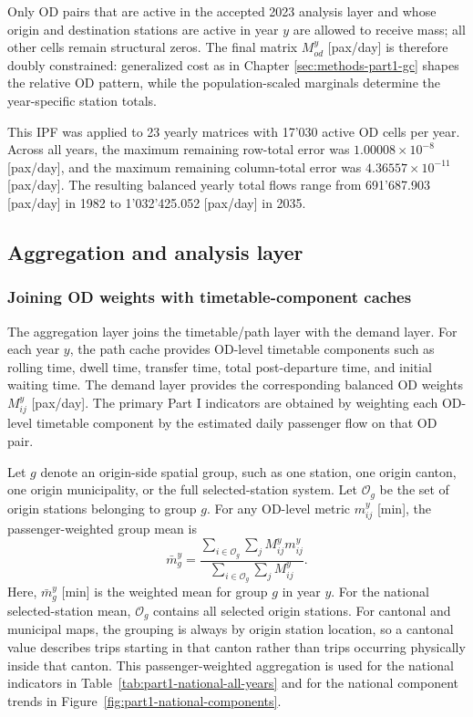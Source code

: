 \documentclass[preprint,12pt]{elsarticle}
\begin{document}
Only OD pairs that are active in the accepted 2023 analysis layer and whose origin and destination stations are active in year $y$ are allowed to receive mass; all other cells remain structural zeros. The final matrix $M^y_{od}$ [pax/day] is therefore doubly constrained: generalized cost as in Chapter \ref{sec:methods-part1-gc} shapes the relative OD pattern, while the population-scaled marginals determine the year-specific station totals.

This IPF was applied to 23 yearly matrices with 17'030 active OD cells per year. Across all years, the maximum remaining row-total error was $1.00008\times10^{-8}$ [pax/day], and the maximum remaining column-total error was $4.36557\times10^{-11}$ [pax/day]. The resulting balanced yearly total flows range from 691'687.903 [pax/day] in 1982 to 1'032'425.052 [pax/day] in 2035.

\subsection{Aggregation and analysis layer}

\subsubsection{Joining OD weights with timetable-component caches}\label{sec:methods-part1-aggregation}

The aggregation layer joins the timetable/path layer with the demand layer. For each year $y$, the path cache provides OD-level timetable components such as rolling time, dwell time, transfer time, total post-departure time, and initial waiting time. The demand layer provides the corresponding balanced OD weights $M^y_{ij}$ [pax/day]. The primary Part I indicators are obtained by weighting each OD-level timetable component by the estimated daily passenger flow on that OD pair.

Let $g$ denote an origin-side spatial group, such as one station, one origin canton, one origin municipality, or the full selected-station system. Let $\mathcal{O}_g$ be the set of origin stations belonging to group $g$. For any OD-level metric $m^y_{ij}$ [min], the passenger-weighted group mean is
\begin{equation}
  \bar m^y_g
  =
  \frac{
    \sum_{i\in\mathcal{O}_g}\sum_j M^y_{ij}m^y_{ij}
  }{
    \sum_{i\in\mathcal{O}_g}\sum_j M^y_{ij}
  }.
  \label{eq:part1-group-weighted-mean}
\end{equation}
Here, $\bar m^y_g$ [min] is the weighted mean for group $g$ in year $y$. For the national selected-station mean, $\mathcal{O}_g$ contains all selected origin stations. For cantonal and municipal maps, the grouping is always by origin station location, so a cantonal value describes trips starting in that canton rather than trips occurring physically inside that canton. This passenger-weighted aggregation is used for the national indicators in Table~\ref{tab:part1-national-all-years} and for the national component trends in Figure~\ref{fig:part1-national-components}.
\end{document}
